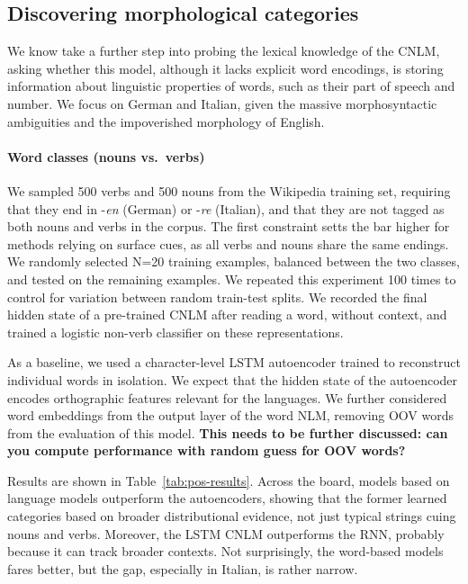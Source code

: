 \subsection{Discovering morphological categories}
\label{sec:categories}

We know take a further step into probing the lexical knowledge of the
CNLM, asking whether this model, although it lacks explicit word
encodings, is storing information about linguistic properties of
words, such as their part of speech and number. We focus on German and
Italian, given the massive morphosyntactic ambiguities and the
impoverished morphology of English.

\paragraph{Word classes (nouns vs.~verbs)}

We sampled 500 verbs and 500 nouns from the Wikipedia training set,
requiring that they end in -\emph{en} (German) or -\emph{re}
(Italian), and that they are not tagged as both nouns and verbs in the
corpus. The first constraint setts the bar higher for methods relying
on surface cues, as all verbs and nouns share the same endings. We
randomly selected N=20 training examples, balanced between the two
classes, and tested on the remaining examples.  We repeated this
experiment 100 times to control for variation between random
train-test splits. We recorded the final hidden state of a pre-trained
CNLM after reading a word, without context, and trained a logistic
non-verb classifier on these representations.

As a baseline, we used a character-level LSTM autoencoder trained to
reconstruct individual words in isolation.  We expect that the hidden
state of the autoencoder encodes orthographic features relevant for
the languages.  We further considered word embeddings from the output
layer of the word NLM, removing OOV words from the evaluation of this
model. \textbf{This needs to be further discussed: can you compute
  performance with random guess for OOV words?}

Results are shown in Table~\ref{tab:pos-results}.  Across the board,
models based on language models outperform the autoencoders, showing
that the former learned categories based on broader distributional
evidence, not just typical strings cuing nouns and verbs. Moreover,
the LSTM CNLM outperforms the RNN, probably because it can track
broader contexts. Not surprisingly, the word-based models fares
better, but the gap, especially in Italian, is rather narrow.

